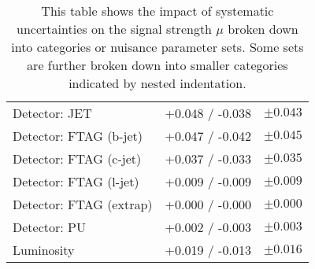 \begin{table}[ht]
\begin{tabular}{lrr}
    \:\:\:\: Detector: JET            & +0.048 / -0.038 & $ \pm 0.043 $ \\
    \:\:\:\: Detector: FTAG (b-jet)   & +0.047 / -0.042 & $ \pm 0.045 $ \\
    \:\:\:\: Detector: FTAG (c-jet)   & +0.037 / -0.033 & $ \pm 0.035 $ \\
    \:\:\:\: Detector: FTAG (l-jet)   & +0.009 / -0.009 & $ \pm 0.009 $ \\
    \:\:\:\: Detector: FTAG (extrap)  & +0.000 / -0.000 & $ \pm 0.000 $ \\
    \:\:\:\: Detector: PU             & +0.002 / -0.003 & $ \pm 0.003 $ \\
    \:\:\:\: Luminosity               & +0.019 / -0.013 & $ \pm 0.016 $ \\
    \bottomrule
  \end{tabular}
\caption{This table shows the impact of systematic uncertainties on the signal
  strength $\mu$ broken down into categories or nuisance parameter sets. Some
  sets are further broken down into smaller categories indicated by nested
  indentation.}
\label{tab:breakdown_012L_MVAVH}
\end{table}
